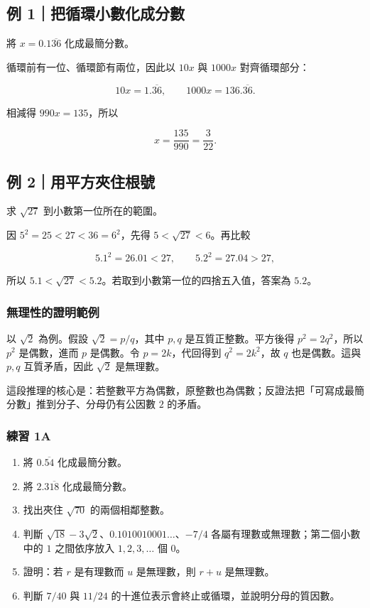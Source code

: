 \documentclass[11pt,a4paper]{article}
\providecommand{\tightlist}{%
  \setlength{\itemsep}{0pt}\setlength{\parskip}{0pt}}
\begin{document}
\subsection{例 1｜把循環小數化成分數}\label{ux4f8b-1ux628aux5faaux74b0ux5c0fux6578ux5316ux6210ux5206ux6578}

將 \(x=0.1\overline{36}\) 化成最簡分數。

循環前有一位、循環節有兩位，因此以 \(10x\) 與 \(1000x\) 對齊循環部分：

\[
10x=1.\overline{36},\qquad 1000x=136.\overline{36}.
\]

相減得 \(990x=135\)，所以

\[
x=\frac{135}{990}=\boxed{\frac3{22}}.
\]

\subsection{例 2｜用平方夾住根號}\label{ux4f8b-2ux7528ux5e73ux65b9ux593eux4f4fux6839ux865f}

求 \(\sqrt{27}\) 到小數第一位所在的範圍。

因 \(5^2=25<27<36=6^2\)，先得 \(5<\sqrt{27}<6\)。再比較

\[
5.1^2=26.01<27,
\qquad
5.2^2=27.04>27,
\]

所以 \(\boxed{5.1<\sqrt{27}<5.2}\)。若取到小數第一位的四捨五入值，答案為 \(5.2\)。

\subsubsection{無理性的證明範例}\label{ux7121ux7406ux6027ux7684ux8b49ux660eux7bc4ux4f8b}

以 \(\sqrt2\) 為例。假設 \(\sqrt2=p/q\)，其中 \(p,q\) 是互質正整數。平方後得 \(p^2=2q^2\)，所以 \(p^2\) 是偶數，進而 \(p\) 是偶數。令 \(p=2k\)，代回得到 \(q^2=2k^2\)，故 \(q\) 也是偶數。這與 \(p,q\) 互質矛盾，因此 \(\sqrt2\) 是無理數。

這段推理的核心是：若整數平方為偶數，原整數也為偶數；反證法把「可寫成最簡分數」推到分子、分母仍有公因數 \(2\) 的矛盾。

\subsubsection{練習 1A}\label{ux7df4ux7fd2-1a}

\begin{enumerate}
\def\labelenumi{\arabic{enumi}.}
\tightlist
\item
  將 \(0.\overline{54}\) 化成最簡分數。
\item
  將 \(2.3\overline{18}\) 化成最簡分數。
\item
  找出夾住 \(\sqrt{70}\) 的兩個相鄰整數。
\item
  判斷 \(\sqrt{18}-3\sqrt2\)、\(0.1010010001\ldots\)、\(-7/4\) 各屬有理數或無理數；第二個小數中的 \(1\) 之間依序放入 \(1,2,3,\ldots\) 個 \(0\)。
\item
  證明：若 \(r\) 是有理數而 \(u\) 是無理數，則 \(r+u\) 是無理數。
\item
  判斷 \(7/40\) 與 \(11/24\) 的十進位表示會終止或循環，並說明分母的質因數。
\end{enumerate}
\end{document}
